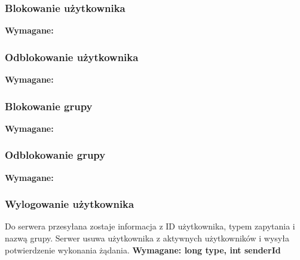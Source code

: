 \documentclass[11pt]{article}
\begin{document}
	\subsubsection{Blokowanie użytkownika}
	\textbf{Wymagane:}
	\subsubsection{Odblokowanie użytkownika}
	\textbf{Wymagane:}
	\subsubsection{Blokowanie grupy}
	\textbf{Wymagane:}
	\subsubsection{Odblokowanie grupy}
	\textbf{Wymagane:}
	\subsubsection{Wylogowanie użytkownika}
	Do serwera przesyłana zostaje informacja z ID użytkownika, typem zapytania i nazwą grupy. Serwer usuwa użytkownika z aktywnych użytkowników i wysyła potwierdzenie wykonania żądania.
	\textbf{Wymagane: long type, int senderId}
	
\end{document}
